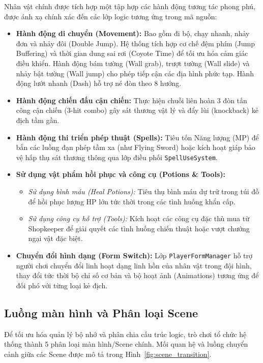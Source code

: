 \documentclass[../DoAn.tex]{subfiles}
\begin{document}
Nhân vật chính được tích hợp một tập hợp các hành động tương tác phong phú, được ánh xạ chính xác đến các lớp logic tương ứng trong mã nguồn:
\begin{itemize}
    \item \textbf{Hành động di chuyển (Movement):} Bao gồm đi bộ, chạy nhanh, nhảy đơn và nhảy đôi (Double Jump). Hệ thống tích hợp cơ chế đệm phím (Jump Buffering) và thời gian dung sai rơi (Coyote Time) để tối ưu hóa cảm giác điều khiển. Hành động bám tường (Wall grab), trượt tường (Wall slide) và nhảy bật tường (Wall jump) cho phép tiếp cận các địa hình phức tạp. Hành động lướt nhanh (Dash) hỗ trợ né đòn theo 8 hướng.
    \item \textbf{Hành động chiến đấu cận chiến:} Thực hiện chuỗi liên hoàn 3 đòn tấn công cận chiến (3-hit combo) gây sát thương vật lý và đẩy lùi (knockback) kẻ địch tầm gần.
    \item \textbf{Hành động thi triển phép thuật (Spells):} Tiêu tốn Năng lượng (MP) để bắn các luồng đạn phép tầm xa (như Flying Sword) hoặc kích hoạt giáp bảo vệ hấp thụ sát thương thông qua lớp điều phối \texttt{SpellUseSystem}.
    \item \textbf{Sử dụng vật phẩm hồi phục và công cụ (Potions \& Tools):}
    \begin{itemize}
        \item \textit{Sử dụng bình máu (Heal Potions):} Tiêu thụ bình máu dự trữ trong túi đồ để hồi phục lượng HP lớn tức thời trong các tình huống khẩn cấp.
        \item \textit{Sử dụng công cụ hỗ trợ (Tools):} Kích hoạt các công cụ đặc thù mua từ Shopkeeper để giải quyết các tình huống chiến thuật hoặc vượt chướng ngại vật đặc biệt.
    \end{itemize}
    \item \textbf{Chuyển đổi hình dạng (Form Switch):} Lớp \texttt{PlayerFormManager} hỗ trợ người chơi chuyển đổi linh hoạt dạng linh hồn của nhân vật trong đội hình, thay đổi tức thời bộ chỉ số cơ bản và bộ hoạt ảnh (Animations) tương ứng để đối phó với từng loại kẻ địch.
\end{itemize}

\subsection{Luồng màn hình và Phân loại Scene}
\label{subsection:3.3.4}

Để tối ưu hóa quản lý bộ nhớ và phân chia cấu trúc logic, trò chơi tổ chức hệ thống thành 5 phân loại màn hình/Scene chính. Mối quan hệ và luồng chuyển cảnh giữa các Scene được mô tả trong Hình~\ref{fig:scene_transition}.
\end{document}
